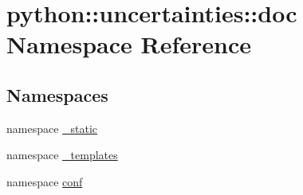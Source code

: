 \hypertarget{namespacepython_1_1uncertainties_1_1doc}{
\section{python::uncertainties::doc Namespace Reference}
\label{namespacepython_1_1uncertainties_1_1doc}
}
\subsection*{Namespaces}
\begin{DoxyCompactItemize}
\item 
namespace \hyperlink{namespacepython_1_1uncertainties_1_1doc_1_1__static}{\_\-static}
\item 
namespace \hyperlink{namespacepython_1_1uncertainties_1_1doc_1_1__templates}{\_\-templates}
\item 
namespace \hyperlink{namespacepython_1_1uncertainties_1_1doc_1_1conf}{conf}
\end{DoxyCompactItemize}
